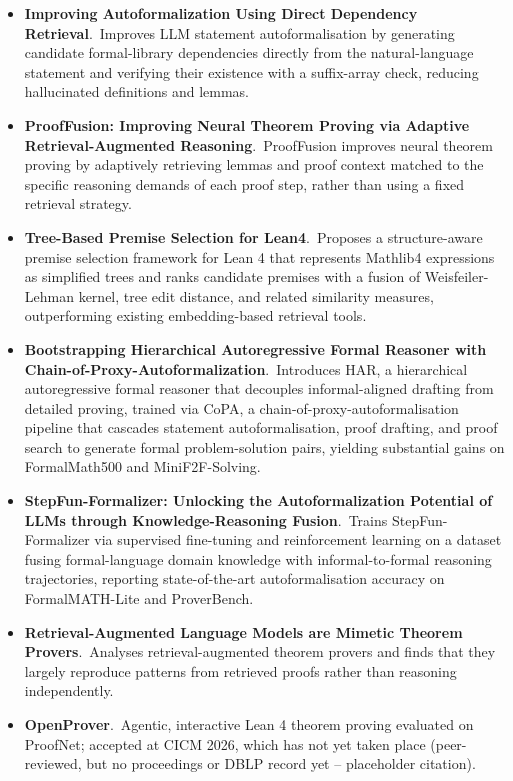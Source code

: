\documentclass[natbib=false,acmsmall,nonacm,11pt]{acmart}
\begin{document}
\begin{itemize}
\item \textbf{Improving Autoformalization Using Direct Dependency Retrieval}.~Improves LLM statement autoformalisation by generating candidate formal-library dependencies directly from the natural-language statement and verifying their existence with a suffix-array check, reducing hallucinated definitions and lemmas.~\cite{wang-etal-2026-improving}
\item \textbf{ProofFusion: Improving Neural Theorem Proving via Adaptive Retrieval-Augmented Reasoning}.~ProofFusion improves neural theorem proving by adaptively retrieving lemmas and proof context matched to the specific reasoning demands of each proof step, rather than using a fixed retrieval strategy.~\cite{DBLP:journals/pacmse/ZhangDZXL26}
\item \textbf{Tree-Based Premise Selection for Lean4}.~Proposes a structure-aware premise selection framework for Lean 4 that represents Mathlib4 expressions as simplified trees and ranks candidate premises with a fusion of Weisfeiler-Lehman kernel, tree edit distance, and related similarity measures, outperforming existing embedding-based retrieval tools.~\cite{DBLP:conf/nips/WangDW25}
\item \textbf{Bootstrapping Hierarchical Autoregressive Formal Reasoner with Chain-of-Proxy-Autoformalization}.~Introduces HAR, a hierarchical autoregressive formal reasoner that decouples informal-aligned drafting from detailed proving, trained via CoPA, a chain-of-proxy-autoformalisation pipeline that cascades statement autoformalisation, proof drafting, and proof search to generate formal problem-solution pairs, yielding substantial gains on FormalMath500 and MiniF2F-Solving.~\cite{DBLP:conf/nips/LiuZXCY25}
\item \textbf{StepFun-Formalizer: Unlocking the Autoformalization Potential of LLMs through Knowledge-Reasoning Fusion}.~Trains StepFun-Formalizer via supervised fine-tuning and reinforcement learning on a dataset fusing formal-language domain knowledge with informal-to-formal reasoning trajectories, reporting state-of-the-art autoformalisation accuracy on FormalMATH-Lite and ProverBench.~\cite{DBLP:conf/aaai/WuHWPSCQZZDYH26}
\item \textbf{Retrieval-Augmented Language Models are Mimetic Theorem Provers}.~Analyses retrieval-augmented theorem provers and finds that they largely reproduce patterns from retrieved proofs rather than reasoning independently.~\cite{DBLP:conf/emnlp/YangHGLXZDZH25}
\item \textbf{OpenProver}.~Agentic, interactive Lean 4 theorem proving evaluated on ProofNet; accepted at CICM 2026, which has not yet taken place (peer-reviewed, but no proceedings or DBLP record yet -- placeholder citation).~\cite{placeholder_kripner2026_openprover}
\end{itemize}
\end{document}
